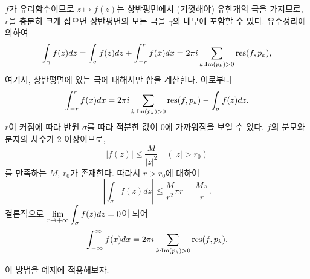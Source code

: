 $f$가 유리함수이므로 $z\mapsto f(z)$는 상반평면에서 (기껏해야) 유한개의 극을 가지므로,
$r$을  충분히 크게 잡으면 상반평면의 모든 극을 $\gamma$의 내부에 포함할 수 있다.
유수정리에 의하여
\[
\int_\gamma f(z)dz = \int_\sigma f(z)dz + \int_{-r}^r f(x)dx
= 2\pi i \sum\limits_{k: \Im(p_k)>0} \mathop{\mathrm{res}}(f,p_k),
\]
여기서, 상반평면에 있는 극에 대해서만 합을 계산한다.
이로부터
\[
\int_{-r}^r f(x)dx = 2\pi i \sum\limits_{k: \Im(p_k)>0} \mathop{\mathrm{res}}(f,p_k)
- \int_\sigma f(z)dz.
\]
$r$이 커짐에 따라 반원 $\sigma$를 따라 적분한 값이 $0$에 가까워짐을 보일 수 있다.
$f$의 분모와 분자의 차수가 $2$ 이상이므로, 
\[
|f(z)| \le \dfrac M{|z|^2} \quad (|z|>r_0)
\]
를 만족하는 $M$, $r_0$가 존재한다.
따라서 $r>r_0$에 대하여
\[
\left| \int_\sigma f(z)dz \right| \le \dfrac  M{r^2} \pi r = \dfrac {M\pi}r.
\]
결론적으로
$\lim\limits_{r\to+\infty} \displaystyle\int_\sigma f(z)dz = 0$이 되어
\[
\int_{-\infty}^\infty f(x)dx
= 2\pi i \sum\limits_{k: \Im(p_k)>0} \mathop{\mathrm{res}}(f,p_k).
\]

이 방법을 예제에 적용해보자.

